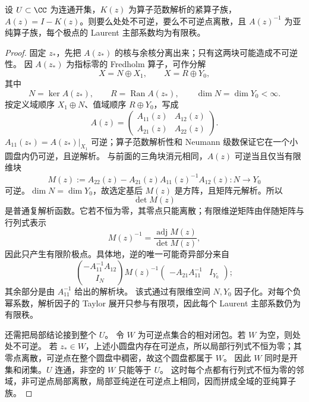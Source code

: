 \begin{theorem}[解析 Fredholm 择一]
设 $U\subset\CC$ 为连通开集，$K(z)$ 为算子范数解析的紧算子族，$A(z)=I-K(z)$。则要么处处不可逆，要么不可逆点离散，且 $A(z)^{-1}$ 为亚纯算子族，每个极点的 Laurent 主部系数均为有限秩。
\end{theorem}
\begin{proof}
固定 $z_*$，先把 $A(z_*)$ 的核与余核分离出来；只有这两块可能造成不可逆性。
因 $A(z_*)$ 为指标零的 Fredholm 算子，可作分解
\[
X=N\oplus X_1,
\qquad
X=R\oplus Y_0,
\]
其中
\[
N=\ker A(z_*),
\qquad
R=\operatorname{Ran}A(z_*),
\qquad
\dim N=\dim Y_0<\infty.
\]
按定义域顺序 $X_1\oplus N$、值域顺序 $R\oplus Y_0$，写成
\[
A(z)=\begin{pmatrix}A_{11}(z)&A_{12}(z)\\A_{21}(z)&A_{22}(z)\end{pmatrix}.
\]
$A_{11}(z_*)=A(z_*)|_{X_1}$ 可逆；算子范数解析性和 Neumann 级数保证它在一个小圆盘内仍可逆，且逆解析。
与前面的三角块消元相同，$A(z)$ 可逆当且仅当有限维块
\[
M(z):=A_{22}(z)-A_{21}(z)A_{11}(z)^{-1}A_{12}(z):N\to Y_0
\]
可逆。$\dim N=\dim Y_0$，故选定基后 $M(z)$ 是方阵，且矩阵元解析。所以
\[
\det M(z)
\]
是普通复解析函数。它若不恒为零，其零点只能离散；有限维逆矩阵由伴随矩阵与行列式表示
\[
M(z)^{-1}=\frac{\operatorname{adj}M(z)}{\det M(z)},
\]
因此只产生有限阶极点。具体地，逆的唯一可能奇异部分来自
\[
\binom{-A_{11}^{-1}A_{12}}{I_N}
M(z)^{-1}
\begin{pmatrix}-A_{21}A_{11}^{-1}&I_{Y_0}\end{pmatrix};
\]
其余部分是由 $A_{11}^{-1}$ 给出的解析块。
该式通过有限维空间 $N,Y_0$ 因子化。对每个负幂系数，解析因子的 Taylor 展开只参与有限项，因此每个 Laurent 主部系数仍为有限秩。

还需把局部结论接到整个 $U$。
令 $W$ 为可逆点集合的相对闭包。若 $W$ 为空，则处处不可逆。
若 $z_*\in W$，上述小圆盘内存在可逆点，所以局部行列式不恒为零；其零点离散，可逆点在整个圆盘中稠密，故这个圆盘都属于 $W$。
因此 $W$ 同时是开集和闭集。$U$ 连通，非空的 $W$ 只能等于 $U$。
这时每个点都有行列式不恒为零的邻域，非可逆点局部离散，局部亚纯逆在可逆点上相同，因而拼成全域的亚纯算子族。
\end{proof}


